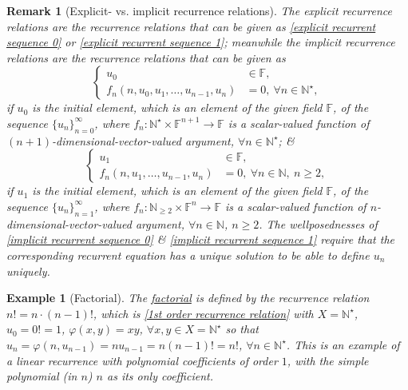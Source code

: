 \documentclass{article}
\newtheorem{example}{Example}
\newtheorem{remark}{Remark}
\begin{document}
\begin{remark}[Explicit- vs. implicit recurrence relations]
	The explicit recurrence relations are the recurrence relations that can be given as \eqref{explicit recurrent sequence 0} or \eqref{explicit recurrent sequence 1}; meanwhile the implicit recurrence relations are the recurrence relations that can be given as
	\begin{equation}
		\label{implicit recurrent sequence 0}
		\left\{\begin{split}
			u_0&\in\mathbb{F},\\
			f_n(n,u_0,u_1,\ldots,u_{n-1},u_n) &= 0,\ \forall n\in\mathbb{N}^\star,
		\end{split}\right.
	\end{equation}
	if $u_0$ is the initial element, which is an element of the given field $\mathbb{F}$, of the sequence $\{u_n\}_{n=0}^\infty$, where $f_n:\mathbb{N}^\star\times\mathbb{F}^{n+1}\to\mathbb{F}$ is a scalar-valued function of $(n + 1)$-dimensional-vector-valued argument, $\forall n\in\mathbb{N}^\star$; \&
	\begin{equation}
		\label{implicit recurrent sequence 1}
		\left\{\begin{split}
			u_1&\in\mathbb{F},\\
			f_n(n,u_1,\ldots,u_{n-1},u_n) &= 0,\ \forall n\in\mathbb{N},\ n\ge2,
		\end{split}\right.
	\end{equation}
	if $u_1$ is the initial element, which is an element of the given field $\mathbb{F}$, of the sequence $\{u_n\}_{n=1}^\infty$, where $f_n:\mathbb{N}_{\ge2}\times\mathbb{F}^n\to\mathbb{F}$ is a scalar-valued function of $n$-dimensional-vector-valued argument, $\forall n\in\mathbb{N}$, $n\ge2$. The wellposednesses of \eqref{implicit recurrent sequence 0} \& \eqref{implicit recurrent sequence 1} require that the corresponding recurrent equation has a unique solution to be able to define $u_n$ uniquely.
\end{remark}

\begin{example}[Factorial]
	The \href{https://en.wikipedia.org/wiki/Factorial}{factorial} is defined by the recurrence relation $n! = n\cdot(n - 1)!$, which is \eqref{1st order recurrence relation} with $X = \mathbb{N}^\star$, $u_0 = 0! = 1$, $\varphi(x,y) = xy$, $\forall x,y\in X = \mathbb{N}^\star$ so that $u_n = \varphi(n,u_{n-1}) = nu_{n-1} = n(n - 1)! = n!$, $\forall n\in\mathbb{N}^\star$. This is an example of a {\rm linear recurrence with polynomial coefficients} of order $1$, with the simple polynomial (in $n$) $n$ as its only coefficient.
\end{example}
\end{document}
